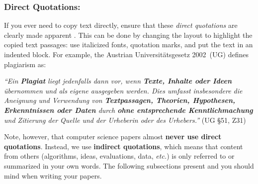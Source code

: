\documentclass[11pt,a4paper]{article}
\begin{document}
\subsubsection*{Direct Quotations:}
If you ever need to copy text directly, ensure that these \emph{direct quotations} are clearly made apparent .
This can be done by changing the layout to highlight the copied text passages: use italicized fonts, quotation marks, and put the text in an indented block.
% 
For example, the Austrian Universitätsgesetz 2002~(UG) defines plagiarism as:
\begin{center}
\begin{minipage}{0.75\textwidth}
\emph{``Ein \textbf{Plagiat} liegt jedenfalls dann vor, wenn \textbf{Texte, Inhalte oder Ideen} übernommen und als eigene ausgegeben werden. Dies umfasst insbesondere die Aneignung und Verwendung von \textbf{Textpassagen, Theorien, Hypothesen, Erkenntnissen oder Daten} durch  \textbf{ohne entsprechende Kenntlichmachung} und Zitierung der Quelle und der Urheberin oder des Urhebers.''} (UG §51, Z31)
\end{minipage}
\end{center}

Note, however, that computer science papers almost \textbf{never use direct quotations}.
Instead, we use \textbf{indirect quotations}, which means that content from others (algorithms, ideas, evaluations, data, \emph{etc.}) is only referred to or summarized in your own words.
The following subsections present  and  you should mind when writing your papers.
\end{document}
